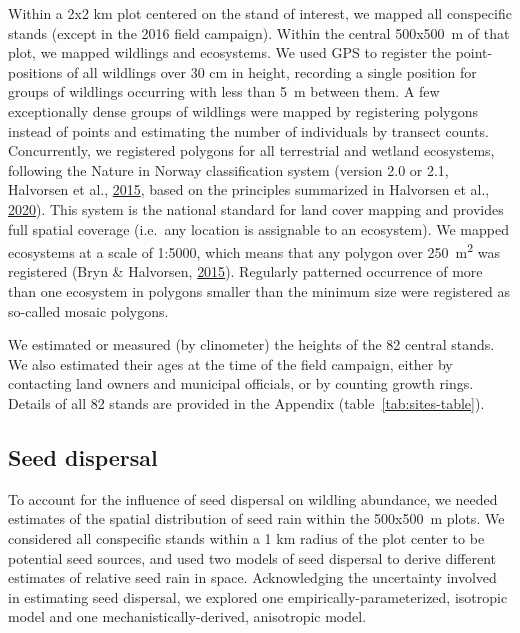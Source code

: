 \documentclass[
]{article}
\begin{document}
Within a 2x2 km plot centered on the stand of interest, we mapped all conspecific stands (except in the 2016 field campaign).
Within the central 500x500~m of that plot, we mapped wildlings and ecosystems.
We used GPS to register the point-positions of all wildlings over 30 cm in height, recording a single position for groups of wildlings occurring with less than 5~m between them.
A few exceptionally dense groups of wildlings were mapped by registering polygons instead of points and estimating the number of individuals by transect counts.
Concurrently, we registered polygons for all terrestrial and wetland ecosystems, following the Nature in Norway classification system (version 2.0 or 2.1, Halvorsen et al., \protect\hyperlink{ref-halvorsenNaturNorgeNiN2015}{2015}, based on the principles summarized in Halvorsen et al., \protect\hyperlink{ref-halvorsenSystematicsEcodiversityEcoSyst2020}{2020}).
This system is the national standard for land cover mapping and provides full spatial coverage (i.e.~any location is assignable to an ecosystem).
We mapped ecosystems at a scale of 1:5000, which means that any polygon over 250~m\textsuperscript{2} was registered (Bryn \& Halvorsen, \protect\hyperlink{ref-brynVeilederKartleggingAv2015}{2015}).
Regularly patterned occurrence of more than one ecosystem in polygons smaller than the minimum size were registered as so-called mosaic polygons.

We estimated or measured (by clinometer) the heights of the 82 central stands.
We also estimated their ages at the time of the field campaign, either by contacting land owners and municipal officials, or by counting growth rings.
Details of all 82 stands are provided in the Appendix (table~\ref{tab:sites-table}).

\hypertarget{seed-dispersal}{%
\subsection{Seed dispersal}\label{seed-dispersal}}

To account for the influence of seed dispersal on wildling abundance, we needed estimates of the spatial distribution of seed rain within the 500x500~m plots.
We considered all conspecific stands within a 1 km radius of the plot center to be potential seed sources, and used two models of seed dispersal to derive different estimates of relative seed rain in space.
Acknowledging the uncertainty involved in estimating seed dispersal, we explored one empirically-parameterized, isotropic model and one mechanistically-derived, anisotropic model.
\end{document}
